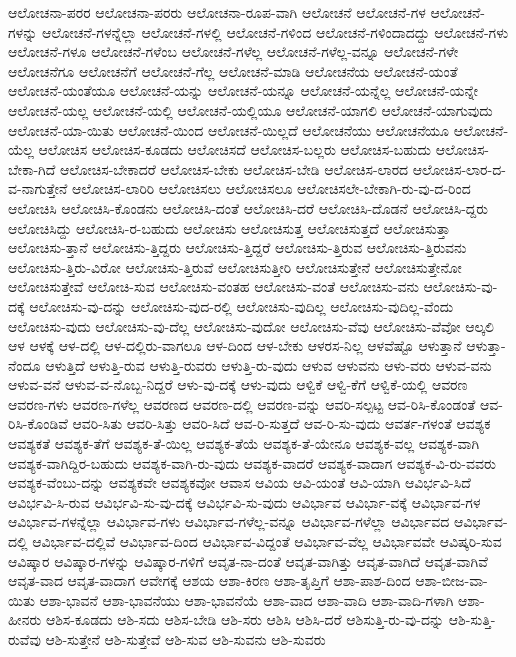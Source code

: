 {ಆಲೋಚನಾ-ಪರರ
ಆಲೋಚನಾ-ಪರರು
ಆಲೋಚನಾ-ರೂಪ-ವಾಗಿ
ಆಲೋಚನೆ
ಆಲೋಚನೆ-ಗಳ
ಆಲೋಚನೆ-ಗಳನ್ನು
ಆಲೋಚನೆ-ಗಳನ್ನೆಲ್ಲಾ
ಆಲೋಚನೆ-ಗಳಲ್ಲಿ
ಆಲೋಚನೆ-ಗಳಿಂದ
ಆಲೋಚನೆ-ಗಳಿಂದಾದದ್ದು
ಆಲೋಚನೆ-ಗಳು
ಆಲೋಚನೆ-ಗಳೂ
ಆಲೋಚನೆ-ಗಳೆಂಬ
ಆಲೋಚನೆ-ಗಳೆಲ್ಲ
ಆಲೋಚನೆ-ಗಳೆಲ್ಲ-ವನ್ನೂ
ಆಲೋಚನೆ-ಗಳೇ
ಆಲೋಚನೆಗೂ
ಆಲೋಚನೆಗೆ
ಆಲೋಚನೆ-ಗೆಲ್ಲ
ಆಲೋಚನೆ-ಮಾಡಿ
ಆಲೋಚನೆಯ
ಆಲೋಚನೆ-ಯಂತೆ
ಆಲೋಚನೆ-ಯಂತೆಯೂ
ಆಲೋಚನೆ-ಯನ್ನು
ಆಲೋಚನೆ-ಯನ್ನೂ
ಆಲೋಚನೆ-ಯನ್ನೆಲ್ಲ
ಆಲೋಚನೆ-ಯನ್ನೇ
ಆಲೋಚನೆ-ಯಲ್ಲ
ಆಲೋಚನೆ-ಯಲ್ಲಿ
ಆಲೋಚನೆ-ಯಲ್ಲಿಯೂ
ಆಲೋಚನೆ-ಯಾಗಲಿ
ಆಲೋಚನೆ-ಯಾಗುವುದು
ಆಲೋಚನೆ-ಯಾ-ಯಿತು
ಆಲೋಚನೆ-ಯಿಂದ
ಆಲೋಚನೆ-ಯಿಲ್ಲದೆ
ಆಲೋಚನೆಯು
ಆಲೋಚನೆಯೂ
ಆಲೋಚನೆ-ಯೆಲ್ಲ
ಆಲೋಚಿಸ
ಆಲೋಚಿಸ-ಕೂಡದು
ಆಲೋಚಿಸದೆ
ಆಲೋಚಿಸ-ಬಲ್ಲರು
ಆಲೋಚಿಸ-ಬಹುದು
ಆಲೋಚಿಸ-ಬೇಕಾ-ಗಿದೆ
ಆಲೋಚಿಸ-ಬೇಕಾದರೆ
ಆಲೋಚಿಸ-ಬೇಕು
ಆಲೋಚಿಸ-ಬೇಡಿ
ಆಲೋಚಿಸ-ಲಾರದ
ಆಲೋಚಿಸ-ಲಾರ-ದ-ವ-ನಾಗುತ್ತೇನೆ
ಆಲೋಚಿಸ-ಲಾರಿರಿ
ಆಲೋಚಿಸಲು
ಆಲೋಚಿಸಲೂ
ಆಲೋಚಿಸಲೇ-ಬೇಕಾಗಿ-ರು-ವು-ದ-ರಿಂದ
ಆಲೋಚಿಸಿ
ಆಲೋಚಿಸಿ-ಕೊಂಡನು
ಆಲೋಚಿಸಿ-ದಂತೆ
ಆಲೋಚಿಸಿ-ದರೆ
ಆಲೋಚಿಸಿ-ದೊಡನೆ
ಆಲೋಚಿಸಿ-ದ್ದರು
ಆಲೋಚಿಸಿದ್ದು
ಆಲೋಚಿಸಿ-ರ-ಬಹುದು
ಆಲೋಚಿಸು
ಆಲೋಚಿಸುತ್ತ
ಆಲೋಚಿಸುತ್ತದೆ
ಆಲೋಚಿಸುತ್ತಾ
ಆಲೋಚಿಸು-ತ್ತಾನೆ
ಆಲೋಚಿಸು-ತ್ತಿದ್ದರು
ಆಲೋಚಿಸು-ತ್ತಿದ್ದರೆ
ಆಲೋಚಿಸು-ತ್ತಿರುವ
ಆಲೋಚಿಸು-ತ್ತಿರುವನು
ಆಲೋಚಿಸು-ತ್ತಿರು-ವಿರೋ
ಆಲೋಚಿಸು-ತ್ತಿರುವೆ
ಆಲೋಚಿಸುತ್ತೀರಿ
ಆಲೋಚಿಸುತ್ತೇನೆ
ಆಲೋಚಿಸುತ್ತೇನೋ
ಆಲೋಚಿಸುತ್ತೇವೆ
ಆಲೋಚಿ-ಸುವ
ಆಲೋಚಿಸು-ವಂತಹ
ಆಲೋಚಿಸು-ವಂತೆ
ಆಲೋಚಿಸು-ವನು
ಆಲೋಚಿಸು-ವು-ದಕ್ಕೆ
ಆಲೋಚಿಸು-ವು-ದನ್ನು
ಆಲೋಚಿಸು-ವುದ-ರಲ್ಲಿ
ಆಲೋಚಿಸು-ವುದಿಲ್ಲ
ಆಲೋಚಿಸು-ವುದಿಲ್ಲ-ವೆಂದು
ಆಲೋಚಿಸು-ವುದು
ಆಲೋಚಿಸು-ವು-ದೆಲ್ಲ
ಆಲೋಚಿಸು-ವುದೋ
ಆಲೋಚಿಸು-ವೆವು
ಆಲೋಚಿಸು-ವೆವೋ
ಆಲ್ಕಲಿ
ಆಳ
ಆಳಕ್ಕೆ
ಆಳ-ದಲ್ಲಿ
ಆಳ-ದಲ್ಲಿರು-ವಾಗಲೂ
ಆಳ-ದಿಂದ
ಆಳ-ಬೇಕು
ಆಳರಸ-ನಿಲ್ಲ
ಆಳವೆಷ್ಟೊ
ಆಳುತ್ತಾನೆ
ಆಳುತ್ತಾ-ನೆಂದೂ
ಆಳುತ್ತಿದೆ
ಆಳುತ್ತಿ-ರುವ
ಆಳುತ್ತಿ-ರುವರು
ಆಳುತ್ತಿ-ರು-ವುದು
ಆಳುವ
ಆಳುವನು
ಆಳು-ವರು
ಆಳುವ-ವನು
ಆಳುವ-ವನೆ
ಆಳುವ-ವ-ನೊಬ್ಬ-ನಿದ್ದರೆ
ಆಳು-ವು-ದಕ್ಕೆ
ಆಳು-ವುದು
ಆಳ್ವಿಕೆ
ಆಳ್ವಿ-ಕೆಗೆ
ಆಳ್ವಿಕೆ-ಯಲ್ಲಿ
ಆವರಣ
ಆವರಣ-ಗಳು
ಆವರಣ-ಗಳೆಲ್ಲ
ಆವರಣದ
ಆವರಣ-ದಲ್ಲಿ
ಆವರಣ-ವನ್ನು
ಆವರಿ-ಸಲ್ಪಟ್ಟ
ಆವ-ರಿಸಿ-ಕೊಂಡಂತೆ
ಆವ-ರಿಸಿ-ಕೊಂಡಿವೆ
ಆವರಿ-ಸಿತು
ಆವರಿ-ಸಿತ್ತು
ಆವರಿ-ಸಿದೆ
ಆವ-ರಿ-ಸುತ್ತದೆ
ಆವ-ರಿ-ಸು-ವುದು
ಆವರ್ತ-ಗಳಂತೆ
ಆವಶ್ಯಕ
ಆವಶ್ಯಕತೆ
ಆವಶ್ಯಕ-ತೆಗೆ
ಆವಶ್ಯಕ-ತೆ-ಯಿಲ್ಲ
ಆವಶ್ಯಕ-ತೆಯೆ
ಆವಶ್ಯಕ-ತೆ-ಯೇನೂ
ಆವಶ್ಯಕ-ವಲ್ಲ
ಆವಶ್ಯಕ-ವಾಗಿ
ಆವಶ್ಯಕ-ವಾಗಿದ್ದಿರ-ಬಹುದು
ಆವಶ್ಯಕ-ವಾಗಿ-ರು-ವುದು
ಆವಶ್ಯಕ-ವಾದರೆ
ಆವಶ್ಯಕ-ವಾದಾಗ
ಆವಶ್ಯಕ-ವಿ-ರು-ವವರು
ಆವಶ್ಯಕ-ವೆಂಬು-ದನ್ನು
ಆವಶ್ಯಕವೇ
ಆವಶ್ಯಕವೋ
ಆವಾಸ
ಆವಿಯ
ಆವಿ-ಯಂತೆ
ಆವಿ-ಯಾಗಿ
ಆವಿರ್ಭವಿ-ಸಿದೆ
ಆವಿರ್ಭವಿ-ಸಿ-ರುವ
ಆವಿರ್ಭವಿ-ಸು-ವು-ದಕ್ಕೆ
ಆವಿರ್ಭವಿ-ಸು-ವುದು
ಆವಿರ್ಭಾವ
ಆವಿರ್ಭಾ-ವಕ್ಕೆ
ಆವಿರ್ಭಾವ-ಗಳ
ಆವಿರ್ಭಾವ-ಗಳನ್ನೆಲ್ಲಾ
ಆವಿರ್ಭಾವ-ಗಳು
ಆವಿರ್ಭಾವ-ಗಳೆಲ್ಲ-ವನ್ನೂ
ಆವಿರ್ಭಾವ-ಗಳೆಲ್ಲಾ
ಆವಿರ್ಭಾವದ
ಆವಿರ್ಭಾವ-ದಲ್ಲಿ
ಆವಿರ್ಭಾವ-ದಲ್ಲಿವೆ
ಆವಿರ್ಭಾವ-ದಿಂದ
ಆವಿರ್ಭಾವ-ವಿದ್ದಂತೆ
ಆವಿರ್ಭಾವ-ವೆಲ್ಲ
ಆವಿರ್ಭಾವವೇ
ಆವಿಷ್ಕರಿ-ಸುವ
ಆವಿಷ್ಕಾರ
ಆವಿಷ್ಕಾರ-ಗಳನ್ನು
ಆವಿಷ್ಕಾರ-ಗಳಿಗೆ
ಆವೃತ-ನಾ-ದಂತೆ
ಆವೃತ-ವಾಗಿತ್ತು
ಆವೃತ-ವಾಗಿದೆ
ಆವೃತ-ವಾಗಿವೆ
ಆವೃತ-ವಾದ
ಆವೃತ-ವಾದಾಗ
ಆವೇಗಕ್ಕೆ
ಆಶಯ
ಆಶಾ-ಕಿರಣ
ಆಶಾ-ತೃಪ್ತಿಗೆ
ಆಶಾ-ಪಾಶ-ದಿಂದ
ಆಶಾ-ಬೀಜ-ವಾ-ಯಿತು
ಆಶಾ-ಭಾವನೆ
ಆಶಾ-ಭಾವನೆಯು
ಆಶಾ-ಭಾವನೆಯೆ
ಆಶಾ-ವಾದ
ಆಶಾ-ವಾದಿ
ಆಶಾ-ವಾದಿ-ಗಳಾಗಿ
ಆಶಾ-ಹೀನರು
ಆಶಿಸ-ಕೂಡದು
ಆಶಿ-ಸದು
ಆಶಿಸ-ಬೇಡಿ
ಆಶಿ-ಸರು
ಆಶಿಸಿ
ಆಶಿಸಿ-ದರೆ
ಆಶಿಸುತ್ತಿ-ರು-ವು-ದನ್ನು
ಆಶಿ-ಸುತ್ತಿ-ರುವೆವು
ಆಶಿ-ಸುತ್ತೇನೆ
ಆಶಿ-ಸುತ್ತೇವೆ
ಆಶಿ-ಸುವ
ಆಶಿ-ಸುವನು
ಆಶಿ-ಸುವರು
}
